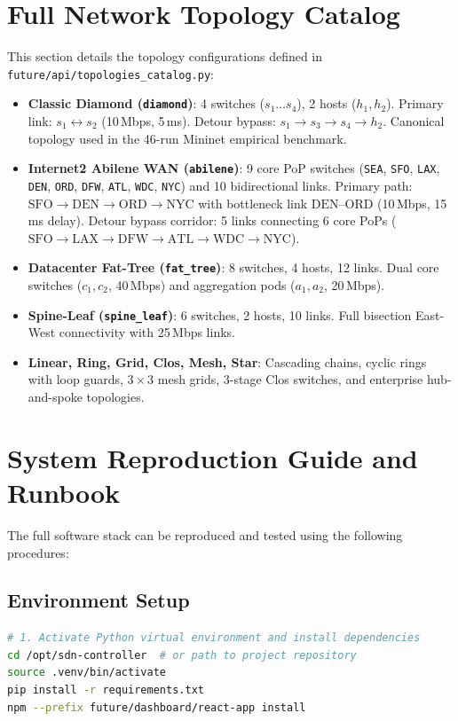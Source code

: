 \section[Network Topology Catalog]{Full Network Topology Catalog}
This section details the topology configurations defined in \texttt{future/api/topologies\_catalog.py}:

\begin{itemize}[leftmargin=1.5em]
  \item \textbf{Classic Diamond (\texttt{diamond})}: 4 switches ($s_1\dots s_4$), 2 hosts ($h_1, h_2$). Primary link: $s_1 \leftrightarrow s_2$ (10\,Mbps, 5\,ms). Detour bypass: $s_1 \to s_3 \to s_4 \to h_2$. Canonical topology used in the 46-run Mininet empirical benchmark.
  \item \textbf{Internet2 Abilene WAN (\texttt{abilene})}: 9 core PoP switches (\texttt{SEA}, \texttt{SFO}, \texttt{LAX}, \texttt{DEN}, \texttt{ORD}, \texttt{DFW}, \texttt{ATL}, \texttt{WDC}, \texttt{NYC}) and 10 bidirectional links. Primary path: $\text{SFO} \to \text{DEN} \to \text{ORD} \to \text{NYC}$ with bottleneck link $\text{DEN--ORD}$ (10\,Mbps, 15\,ms delay). Detour bypass corridor: 5 links connecting 6 core PoPs ($\text{SFO} \to \text{LAX} \to \text{DFW} \to \text{ATL} \to \text{WDC} \to \text{NYC}$).
  \item \textbf{Datacenter Fat-Tree (\texttt{fat\_tree})}: 8 switches, 4 hosts, 12 links. Dual core switches ($c_1, c_2$, 40\,Mbps) and aggregation pods ($a_1, a_2$, 20\,Mbps).
  \item \textbf{Spine-Leaf (\texttt{spine\_leaf})}: 6 switches, 2 hosts, 10 links. Full bisection East-West connectivity with 25\,Mbps links.
  \item \textbf{Linear, Ring, Grid, Clos, Mesh, Star}: Cascading chains, cyclic rings with loop guards, $3 \times 3$ mesh grids, 3-stage Clos switches, and enterprise hub-and-spoke topologies.
\end{itemize}

\section[Reproduction Runbook]{System Reproduction Guide and Runbook}
The full software stack can be reproduced and tested using the following procedures:

\subsection{Environment Setup}
\begin{lstlisting}[language=bash]
# 1. Activate Python virtual environment and install dependencies
cd /opt/sdn-controller  # or path to project repository
source .venv/bin/activate
pip install -r requirements.txt
npm --prefix future/dashboard/react-app install
\end{lstlisting}

